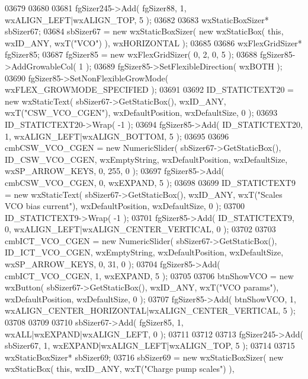 \begin{DoxyCode}
03679     
03680     
03681     fgSizer245->Add( fgSizer88, 1, wxALIGN\_LEFT|wxALIGN\_TOP, 5 );
03682     
03683     wxStaticBoxSizer* sbSizer67;
03684     sbSizer67 = \textcolor{keyword}{new} wxStaticBoxSizer( \textcolor{keyword}{new} wxStaticBox( \textcolor{keyword}{this}, wxID\_ANY, wxT(\textcolor{stringliteral}{"VCO"}) ), wxHORIZONTAL );
03685     
03686     wxFlexGridSizer* fgSizer85;
03687     fgSizer85 = \textcolor{keyword}{new} wxFlexGridSizer( 0, 2, 0, 5 );
03688     fgSizer85->AddGrowableCol( 1 );
03689     fgSizer85->SetFlexibleDirection( wxBOTH );
03690     fgSizer85->SetNonFlexibleGrowMode( wxFLEX\_GROWMODE\_SPECIFIED );
03691     
03692     ID_STATICTEXT20 = \textcolor{keyword}{new} wxStaticText( sbSizer67->GetStaticBox(), wxID\_ANY, wxT(\textcolor{stringliteral}{"CSW\_VCO\_CGEN"}), 
      wxDefaultPosition, wxDefaultSize, 0 );
03693     ID_STATICTEXT20->Wrap( -1 );
03694     fgSizer85->Add( ID_STATICTEXT20, 1, wxALIGN\_LEFT|wxALIGN\_BOTTOM, 5 );
03695     
03696     cmbCSW_VCO_CGEN = \textcolor{keyword}{new} NumericSlider( sbSizer67->GetStaticBox(), 
      ID_CSW_VCO_CGEN, wxEmptyString, wxDefaultPosition, wxDefaultSize, wxSP\_ARROW\_KEYS, 0, 255, 0 );
03697     fgSizer85->Add( cmbCSW_VCO_CGEN, 0, wxEXPAND, 5 );
03698     
03699     ID_STATICTEXT9 = \textcolor{keyword}{new} wxStaticText( sbSizer67->GetStaticBox(), wxID\_ANY, wxT(\textcolor{stringliteral}{"Scales VCO bias current"}),
       wxDefaultPosition, wxDefaultSize, 0 );
03700     ID_STATICTEXT9->Wrap( -1 );
03701     fgSizer85->Add( ID_STATICTEXT9, 0, wxALIGN\_LEFT|wxALIGN\_CENTER\_VERTICAL, 0 );
03702     
03703     cmbICT_VCO_CGEN = \textcolor{keyword}{new} NumericSlider( sbSizer67->GetStaticBox(), 
      ID_ICT_VCO_CGEN, wxEmptyString, wxDefaultPosition, wxDefaultSize, wxSP\_ARROW\_KEYS, 0, 31, 0 );
03704     fgSizer85->Add( cmbICT_VCO_CGEN, 1, wxEXPAND, 5 );
03705     
03706     btnShowVCO = \textcolor{keyword}{new} wxButton( sbSizer67->GetStaticBox(), wxID\_ANY, wxT(\textcolor{stringliteral}{"VCO params"}), wxDefaultPosition, 
      wxDefaultSize, 0 );
03707     fgSizer85->Add( btnShowVCO, 1, wxALIGN\_CENTER\_HORIZONTAL|wxALIGN\_CENTER\_VERTICAL, 5 );
03708     
03709     
03710     sbSizer67->Add( fgSizer85, 1, wxALL|wxEXPAND|wxALIGN\_LEFT, 0 );
03711     
03712     
03713     fgSizer245->Add( sbSizer67, 1, wxEXPAND|wxALIGN\_LEFT|wxALIGN\_TOP, 5 );
03714     
03715     wxStaticBoxSizer* sbSizer69;
03716     sbSizer69 = \textcolor{keyword}{new} wxStaticBoxSizer( \textcolor{keyword}{new} wxStaticBox( \textcolor{keyword}{this}, wxID\_ANY, wxT(\textcolor{stringliteral}{"Charge pump scales"}) ), 

\end{DoxyCode}
